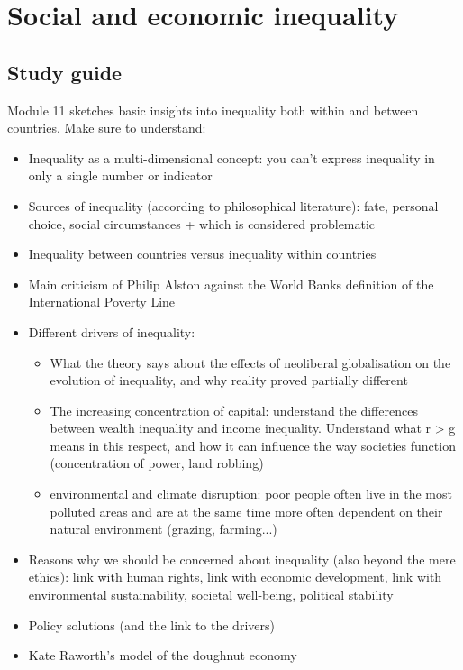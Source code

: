 \documentclass[../summary.tex]{subfiles}
\begin{document}
\section{Social and economic inequality}

\subsection{Study guide}

Module 11 sketches basic insights into inequality both within and between countries. Make sure to understand:
\begin{itemize}
	\item Inequality as a multi-dimensional concept: you can't express inequality in only a single number or indicator
	\item Sources of inequality (according to philosophical literature): fate, personal choice, social circumstances + which is considered problematic
	\item Inequality between countries versus inequality within countries
	\item Main criticism of Philip Alston against the World Banks
	      definition of the International Poverty Line
	\item Different drivers of inequality:
	      \begin{itemize}
		      \item What the theory says about the effects of neoliberal globalisation on the evolution of inequality, and why reality proved partially different
		      \item The increasing concentration of capital: understand the differences between wealth inequality and income inequality. Understand what r > g means in this respect, and how it can influence the way societies function (concentration of power, land robbing)
		      \item environmental and climate disruption: poor people often live in the most polluted areas and are at the same time more often dependent on their natural environment (grazing, farming...)
	      \end{itemize}
	\item Reasons why we should be concerned about inequality (also beyond the mere ethics): link with human rights, link with economic development, link with environmental sustainability, societal well-being, political stability
	\item Policy solutions (and the link to the drivers)
	\item Kate Raworth's model of the doughnut economy
\end{itemize}
\end{document}
